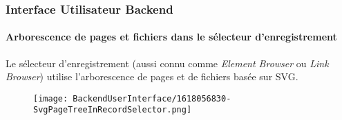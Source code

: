 %

\begin{frame}[fragile]
	\frametitle{Interface Utilisateur Backend}
	\framesubtitle{Arborescence de pages et fichiers dans le sélecteur d'enregistrement}

	Le sélecteur d'enregistrement (aussi connu comme \textit{Element Browser} ou \textit{Link Browser})
	utilise l'arborescence de pages et de fichiers basée sur SVG.

	\begin{figure}
		\texttt{[image: BackendUserInterface/1618056830-SvgPageTreeInRecordSelector.png]}
	\end{figure}

\end{frame}

